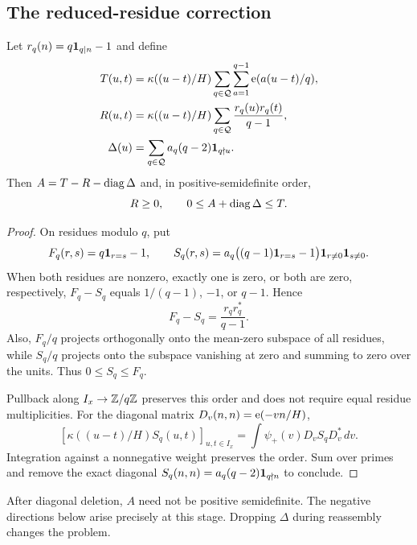 \subsection{The reduced-residue correction}
\begin{proposition}\label{prop:decomp}
Let $r_q(n)=q\mathbf 1_{q\mid n}-1$ and define
\begin{align*}
T(u,t)&=\kappa((u-t)/H)\sum_{q\in\mathcal Q}\sum_{a=1}^{q-1}\mathrm e(a(u-t)/q),\\
R(u,t)&=\kappa((u-t)/H)\sum_{q\in\mathcal Q}\frac{r_q(u)r_q(t)}{q-1},\\
\Delta(u)&=\sum_{q\in\mathcal Q}a_q(q-2)\mathbf 1_{q\nmid u}.
\end{align*}
Then $A=T-R-\operatorname{diag}\Delta$ and, in positive-semidefinite order,
\[
R\ge0,\qquad0\le A+\operatorname{diag}\Delta\le T.
\]
\end{proposition}
\begin{proof}
On residues modulo $q$, put
\[
F_q(r,s)=q\mathbf 1_{r=s}-1,\qquad
S_q(r,s)=a_q\big((q-1)\mathbf 1_{r=s}-1\big)\mathbf 1_{r\ne0}\mathbf 1_{s\ne0}.
\]
When both residues are nonzero, exactly one is zero, or both are zero, respectively, $F_q-S_q$ equals $1/(q-1)$, $-1$, or $q-1$. Hence
\[
F_q-S_q=\frac{r_qr_q^*}{q-1}.
\]
Also, $F_q/q$ projects orthogonally onto the mean-zero subspace of all residues, while $S_q/q$ projects onto the subspace vanishing at zero and summing to zero over the units. Thus $0\le S_q\le F_q$.

Pullback along $I_x\to\mathbb Z/q\mathbb Z$ preserves this order and does not require equal residue multiplicities. For the diagonal matrix $D_v(n,n)=\mathrm e(-vn/H)$,
\[
[\kappa((u-t)/H)S_q(u,t)]_{u,t\in I_x}
=\int\psi_+(v)D_vS_qD_v^*\,dv.
\]
Integration against a nonnegative weight preserves the order. Sum over primes and remove the exact diagonal $S_q(n,n)=a_q(q-2)\mathbf 1_{q\nmid n}$ to conclude.
\end{proof}
After diagonal deletion, $A$ need not be positive semidefinite. The negative directions below arise precisely at this stage. Dropping $\Delta$ during reassembly changes the problem.
